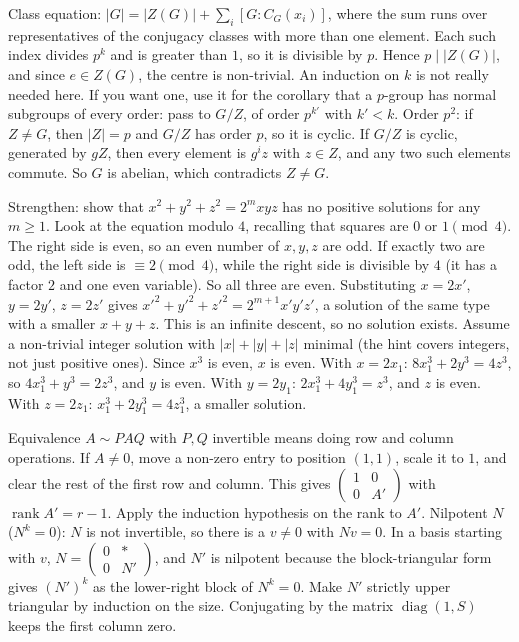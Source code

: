 \documentclass[11pt,a4paper]{article}
\begin{document}
 Class equation: $|G|=|Z(G)|+\sum_i[G:C_G(x_i)]$, where the sum runs over representatives of the conjugacy classes with more than one element. Each such index divides $p^k$ and is greater than $1$, so it is divisible by $p$.
 Hence $p\mid|Z(G)|$, and since $e\in Z(G)$, the centre is non-trivial. An induction on $k$ is not really needed here. If you want one, use it for the corollary that a $p$-group has normal subgroups of every order: pass to $G/Z$, of order $p^{k'}$ with $k'<k$.
 Order $p^2$: if $Z\neq G$, then $|Z|=p$ and $G/Z$ has order $p$, so it is cyclic. If $G/Z$ is cyclic, generated by $gZ$, then every element is $g^iz$ with $z\in Z$, and any two such elements commute. So $G$ is abelian, which contradicts $Z\neq G$.

 Strengthen: show that $x^2+y^2+z^2=2^m xyz$ has no positive solutions for any $m\ge1$. Look at the equation modulo $4$, recalling that squares are $0$ or $1\pmod 4$.
 The right side is even, so an even number of $x,y,z$ are odd. If exactly two are odd, the left side is $\equiv2\pmod4$, while the right side is divisible by $4$ (it has a factor $2$ and one even variable). So all three are even.
 Substituting $x=2x'$, $y=2y'$, $z=2z'$ gives $x'^2+y'^2+z'^2=2^{m+1}x'y'z'$, a solution of the same type with a smaller $x+y+z$. This is an infinite descent, so no solution exists.
 Assume a non-trivial integer solution with $|x|+|y|+|z|$ minimal (the hint covers integers, not just positive ones). Since $x^3$ is even, $x$ is even.
 With $x=2x_1$: $8x_1^3+2y^3=4z^3$, so $4x_1^3+y^3=2z^3$, and $y$ is even. With $y=2y_1$: $2x_1^3+4y_1^3=z^3$, and $z$ is even. With $z=2z_1$: $x_1^3+2y_1^3=4z_1^3$, a smaller solution.

 Equivalence $A\sim PAQ$ with $P,Q$ invertible means doing row and column operations. If $A\neq0$, move a non-zero entry to position $(1,1)$, scale it to $1$, and clear the rest of the first row and column.
 This gives $\begin{pmatrix}1&0\\0&A'\end{pmatrix}$ with $\operatorname{rank}A'=r-1$. Apply the induction hypothesis on the rank to $A'$.
 Nilpotent $N$ ($N^k=0$): $N$ is not invertible, so there is a $v\neq0$ with $Nv=0$. In a basis starting with $v$, $N=\begin{pmatrix}0&*\\0&N'\end{pmatrix}$, and $N'$ is nilpotent because the block-triangular form gives $(N')^k$ as the lower-right block of $N^k=0$. Make $N'$ strictly upper triangular by induction on the size. Conjugating by the matrix $\operatorname{diag}(1,S)$ keeps the first column zero.
\end{document}

